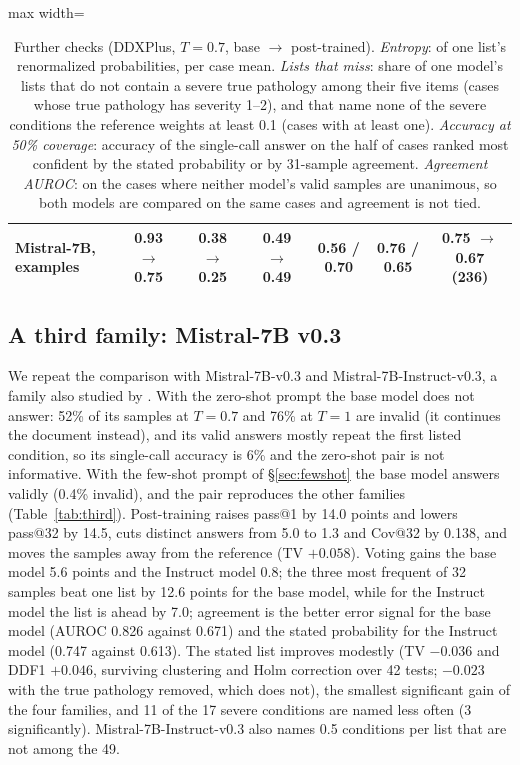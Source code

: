\documentclass[11pt]{article}
\begin{document}
\begin{table}[t]
\begin{adjustbox}{max width=\linewidth}
\begin{tabular}{lcccccc}
Mistral-7B, examples & 0.93 $\rightarrow$ 0.75 & 0.38 $\rightarrow$ 0.25 & 0.49 $\rightarrow$ 0.49 & 0.56 / 0.70 & 0.76 / 0.65 & 0.75 $\rightarrow$ 0.67 (236) \\
\bottomrule
\end{tabular}
\end{adjustbox}
\caption{Further checks (DDXPlus, $T{=}0.7$, base $\rightarrow$ post-trained). \emph{Entropy}: of one list's renormalized probabilities, per case mean. \emph{Lists that miss}: share of one model's lists that do not contain a severe true pathology among their five items (cases whose true pathology has severity 1--2), and that name none of the severe conditions the reference weights at least 0.1 (cases with at least one). \emph{Accuracy at 50\% coverage}: accuracy of the single-call answer on the half of cases ranked most confident by the stated probability or by 31-sample agreement. \emph{Agreement AUROC}: on the cases where neither model's valid samples are unanimous, so both models are compared on the same cases and agreement is not tied.}
\label{tab:r13pairs}
\end{table}

\subsection{A third family: Mistral-7B v0.3}\label{sec:mistral}
We repeat the comparison with Mistral-7B-v0.3 and Mistral-7B-Instruct-v0.3, a family also studied by \citet{jang2026cannotsample}. With the zero-shot prompt the base model does not answer: 52\% of its samples at $T{=}0.7$ and 76\% at $T{=}1$ are invalid (it continues the document instead), and its valid answers mostly repeat the first listed condition, so its single-call accuracy is 6\% and the zero-shot pair is not informative. With the few-shot prompt of \S\ref{sec:fewshot} the base model answers validly (0.4\% invalid), and the pair reproduces the other families (Table~\ref{tab:third}). Post-training raises pass@1 by 14.0 points and lowers pass@32 by 14.5, cuts distinct answers from 5.0 to 1.3 and Cov@32 by 0.138, and moves the samples away from the reference (TV $+0.058$). Voting gains the base model 5.6 points and the Instruct model 0.8; the three most frequent of 32 samples beat one list by 12.6 points for the base model, while for the Instruct model the list is ahead by 7.0; agreement is the better error signal for the base model (AUROC 0.826 against 0.671) and the stated probability for the Instruct model (0.747 against 0.613). The stated list improves modestly (TV $-0.036$ and DDF1 $+0.046$, surviving clustering and Holm correction over 42 tests; $-0.023$ with the true pathology removed, which does not), the smallest significant gain of the four families, and 11 of the 17 severe conditions are named less often (3 significantly). Mistral-7B-Instruct-v0.3 also names 0.5 conditions per list that are not among the 49.
\end{document}
